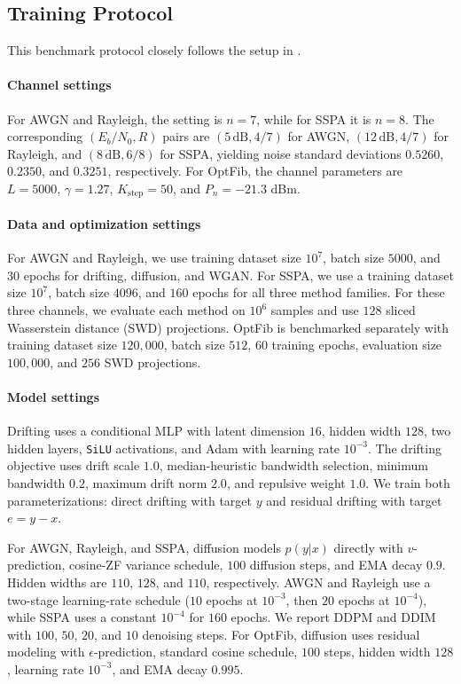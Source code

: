 \documentclass[conference]{IEEEtran}
\begin{document}
\subsection{Training Protocol}
This benchmark protocol closely follows the setup in \cite{kimicc2024}.
\paragraph{Channel settings}
For AWGN and Rayleigh, the setting is \(n=7\), while for SSPA it is \(n=8\). The corresponding \((E_b/N_0, R)\) pairs are \((5\,\mathrm{dB}, 4/7)\) for AWGN, \((12\,\mathrm{dB}, 4/7)\) for Rayleigh, and \((8\,\mathrm{dB}, 6/8)\) for SSPA, yielding noise standard deviations \(0.5260\), \(0.2350\), and \(0.3251\), respectively. For OptFib, the channel parameters are \(L=5000\), \(\gamma=1.27\), \(K_{\text{step}}=50\), and \(P_n=-21.3\) dBm.

\paragraph{Data and optimization settings}
For AWGN and Rayleigh, we use training dataset size \(10^7\), batch size \(5000\), and \(30\) epochs for drifting, diffusion, and WGAN. For SSPA, we use a training dataset size \(10^7\), batch size \(4096\), and \(160\) epochs for all three method families. For these three channels, we evaluate each method on \(10^6\) samples and use \(128\) sliced
Wasserstein distance (SWD) projections. OptFib is benchmarked separately with training dataset size \(120{,}000\), batch size \(512\), \(60\) training epochs, evaluation size \(100{,}000\), and \(256\) SWD projections.

\paragraph{Model settings}
Drifting uses a conditional MLP with latent dimension \(16\), hidden width \(128\), two hidden layers, \texttt{SiLU} activations, and Adam with learning rate \(10^{-3}\). The drifting objective uses drift scale \(1.0\), median-heuristic bandwidth selection, minimum bandwidth \(0.2\), maximum drift norm \(2.0\), and repulsive weight \(1.0\). We train both parameterizations: direct drifting with target \(y\) and residual drifting with target \(e=y-x\).

For AWGN, Rayleigh, and SSPA, diffusion models \(p(y | x)\) directly with \(v\)-prediction, cosine-ZF variance schedule, \(100\) diffusion steps, and EMA decay \(0.9\). Hidden widths are \(110\), \(128\), and \(110\), respectively. AWGN and Rayleigh use a two-stage learning-rate schedule (\(10\) epochs at \(10^{-3}\), then \(20\) epochs at \(10^{-4}\)), while SSPA uses a constant \(10^{-4}\) for \(160\) epochs. We report DDPM and DDIM with \(100\), \(50\), \(20\), and \(10\) denoising steps. For OptFib, diffusion uses residual modeling with \(\epsilon\)-prediction, standard cosine schedule, \(100\) steps, hidden width \(128\), learning rate \(10^{-3}\), and EMA decay \(0.995\).
\end{document}
